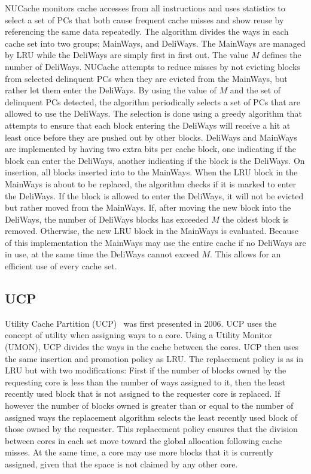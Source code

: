 NUCache monitors cache accesses from all instructions and uses statistics to select a set of PCs that both cause frequent cache misses and show reuse by referencing the same data repeatedly.
The algorithm divides the ways in each cache set into two groups; MainWays, and DeliWays.
The MainWays are managed by LRU while the DeliWays are simply first in first out.
The value $M$ defines the number of DeliWays.
NUCache attempts to reduce misses by not evicting blocks from selected delinquent PCs when they are evicted from the MainWays, but rather let them enter the DeliWays.
By using the value of $M$ and the set of delinquent PCs detected, the algorithm periodically selects a set of PCs that are allowed to use the DeliWays.
The selection is done using a greedy algorithm that attempts to ensure that each block entering the DeliWays will receive a hit at least once before they are pushed out by other blocks.
DeliWays and MainWays are implemented by having two extra bits per cache block, one indicating if the block can enter the DeliWays, another indicating if the block is the DeliWays.
On insertion, all blocks inserted into to the MainWays.
When the LRU block in the MainWays is about to be replaced, the algorithm checks if it is marked to enter the DeliWays.
If the block is allowed to enter the DeliWays, it will not be evicted but rather moved from the MainWays.
If, after moving the new block into the DeliWays, the number of DeliWays blocks has exceeded $M$ the oldest block is removed.
Otherwise, the new LRU block in the MainWays is evaluated.
Because of this implementation the MainWays may use the entire cache if no DeliWays are in use, at the same time the DeliWays cannot exceed $M$.
This allows for an efficient use of every cache set.


\subsection{UCP}

Utility Cache Partition (UCP)~\cite{Qureshi2006} was first presented in 2006. 
UCP uses the concept of utility when assigning ways to a core.
Using a Utility Monitor (UMON), UCP divides the ways in the cache between the cores.
UCP then uses the same insertion and promotion policy as LRU.
The replacement policy is as in LRU but with two modifications:
First if the number of blocks owned by the requesting core is less than the number of ways assigned to it, then the least recently used block that is not assigned to the requester core is replaced.
If however the number of blocks owned is greater than or equal to the number of assigned ways the replacement algorithm selects the least recently used block of those owned by the requester.
This replacement policy ensures that the division between cores in each set move toward the global allocation following cache misses.
At the same time, a core may use more blocks that it is currently assigned, given that the space is not claimed by any other core.

